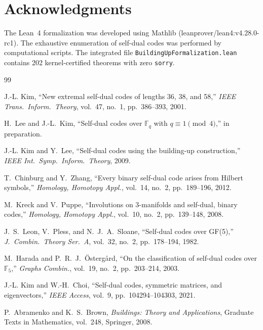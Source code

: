 \documentclass[12pt]{article}
\newcommand{\F}{\mathbb{F}}
\begin{document}
\section*{Acknowledgments}

The Lean~4 formalization was developed using Mathlib (leanprover/lean4:v4.28.0-rc1). The exhaustive enumeration of self-dual codes was performed by computational scripts. The integrated file \texttt{BuildingUpFormalization.lean} contains 202 kernel-certified theorems with zero \texttt{sorry}.



\begin{thebibliography}{99}

J.-L. Kim,
``New extremal self-dual codes of lengths 36, 38, and 58,''
\textit{IEEE Trans.\ Inform.\ Theory}, vol.~47, no.~1, pp.~386--393, 2001.

H.~Lee and J.-L.~Kim,
``Self-dual codes over $\F_q$ with $q \equiv 1 \pmod{4}$,'' in preparation.

J.-L. Kim and Y.~Lee,
``Self-dual codes using the building-up construction,''
\textit{IEEE Int.\ Symp.\ Inform.\ Theory}, 2009.

T.~Chinburg and Y.~Zhang,
``Every binary self-dual code arises from Hilbert symbols,''
\textit{Homology, Homotopy Appl.}, vol.~14, no.~2, pp.~189--196, 2012.

M.~Kreck and V.~Puppe,
``Involutions on 3-manifolds and self-dual, binary codes,''
\textit{Homology, Homotopy Appl.}, vol.~10, no.~2, pp.~139--148, 2008.

J.~S.~Leon, V.~Pless, and N.~J.~A.~Sloane,
``Self-dual codes over GF(5),''
\textit{J.\ Combin.\ Theory Ser.~A}, vol.~32, no.~2, pp.~178--194, 1982.

M.~Harada and P.~R.~J.~\"Osterg\r{a}rd,
``On the classification of self-dual codes over $\mathbb{F}_5$,''
\textit{Graphs Combin.}, vol.~19, no.~2, pp.~203--214, 2003.

J.-L. Kim and W.-H.~Choi,
``Self-dual codes, symmetric matrices, and eigenvectors,''
\textit{IEEE Access}, vol.~9, pp.~104294--104303, 2021.

P.~Abramenko and K.~S.~Brown,
\textit{Buildings: Theory and Applications},
Graduate Texts in Mathematics, vol.~248, Springer, 2008.


\end{thebibliography}
\end{document}
